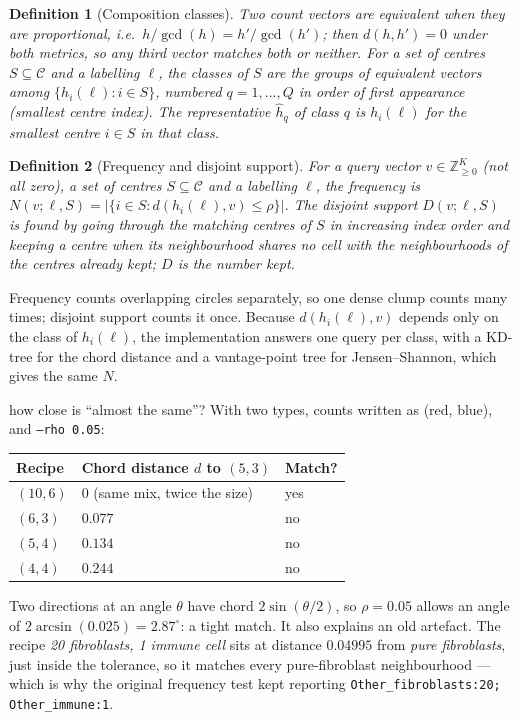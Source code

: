 \documentclass[11pt,a4paper]{article}
\newtheorem{definition}{Definition}[section]
\theoremstyle{remark}
\newcommand{\cells}{\mathcal{C}}
\newcommand{\lab}{\ell}
\newcommand{\Nat}{\mathbb{Z}_{\ge 0}}
\begin{document}
\begin{definition}[Composition classes]
\label{def:classes}
Two count vectors are \emph{equivalent} when they are proportional, i.e.\
$h/\gcd(h)=h'/\gcd(h')$; then $d(h,h')=0$ under both metrics, so any third
vector matches both or neither. For a set of centres $S\subseteq\cells$ and a
labelling $\lab$, the \emph{classes} of $S$ are the groups of equivalent
vectors among $\{h_i(\lab):i\in S\}$, numbered $q=1,\dots,Q$ in order of first
appearance (smallest centre index). The \emph{representative} $\hat h_q$ of
class $q$ is $h_i(\lab)$ for the smallest centre $i\in S$ in that class.
\end{definition}

\begin{definition}[Frequency and disjoint support]
\label{def:freq}
For a \emph{query vector} $v\in\Nat^K$ (not all zero), a set of centres
$S\subseteq\cells$ and a labelling $\lab$, the \emph{frequency} is
$N(v;\lab,S)=|\{i\in S:d(h_i(\lab),v)\le\rho\}|$. The \emph{disjoint support}
$D(v;\lab,S)$ is found by going through the matching centres of $S$ in
increasing index order and keeping a centre when its neighbourhood shares no
cell with the neighbourhoods of the centres already kept; $D$ is the number
kept.
\end{definition}

Frequency counts overlapping circles separately, so one dense clump counts many
times; disjoint support counts it once. Because $d(h_i(\lab),v)$ depends only
on the class of $h_i(\lab)$, the implementation answers one query per class,
with a KD-tree for the chord distance and a vantage-point tree for
Jensen--Shannon, which gives the same $N$.

\begin{example}{how close is ``almost the same''?}
With two types, counts written as (red, blue), and \texttt{--rho 0.05}:
\begin{center}
\begin{tabular}{lll}
\toprule
Recipe & Chord distance $d$ to $(5,3)$ & Match? \\
\midrule
$(10,6)$ & $0$ (same mix, twice the size) & yes \\
$(6,3)$ & $0.077$ & no \\
$(5,4)$ & $0.134$ & no \\
$(4,4)$ & $0.244$ & no \\
\bottomrule
\end{tabular}
\end{center}
Two directions at an angle $\theta$ have chord $2\sin(\theta/2)$, so
$\rho=0.05$ allows an angle of $2\arcsin(0.025)=2.87^\circ$: a tight match.
It also explains an old artefact. The recipe \emph{20 fibroblasts, 1 immune
cell} sits at distance $0.04995$ from \emph{pure fibroblasts}, just inside the
tolerance, so it matches every pure-fibroblast neighbourhood --- which is why
the original frequency test kept reporting
\texttt{Other\_fibroblasts:20; Other\_immune:1}.
\end{example}
\end{document}
